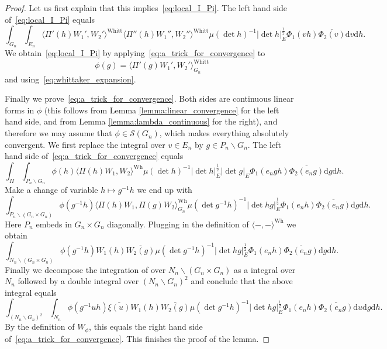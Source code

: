 \documentclass[letterpaper,11pt]{amsart}
\newcommand{\cS}{\mathcal{S}}
\newcommand{\rd}{\mathrm{d}}
\newcommand{\bs}{\backslash}
\newcommand{\<}{\negthickspace}
\providecommand{\abs}[1]{\lvert#1\rvert}
\theoremstyle{definition}
\theoremstyle{plain}
\theoremstyle{remark}
\numberwithin{equation}{section}
\begin{document}
\begin{proof}
Let us first explain that this implies~\eqref{eq:local_I_Pi}. The left hand
side of~\eqref{eq:local_I_Pi} equals
    \[
    \int_{G_n} \int_{E_n}
    \langle \Pi'(h)W_1', W_2' \rangle^{\mathrm{Whitt}}
    \langle \Pi''(h)W_1'', W_2'' \rangle^{\mathrm{Whitt}}
    \mu(\det h)^{-1} \abs{\det h}_E^{\frac{1}{2}}
    \Phi_1(vh) \overline{\Phi_2(v)} \rd v \rd h.
    \]
We obtain~\eqref{eq:local_I_Pi} by
applying~\eqref{eq:a_trick_for_convergence} to
    \[
    \phi(g) = \langle \Pi'(g)W_1', W_2' \rangle_{G_n}^{\mathrm{Whitt}}
    \]
and using~\eqref{eq:whittaker_expansion}.

Finally we prove~\eqref{eq:a_trick_for_convergence}. Both sides are
continuous linear forms in $\phi$ (this follows from Lemma
\ref{lemma:linear_convergence} for the left hand side, and from Lemma
\ref{lemma:lambda_continuous} for the right), and therefore we may assume
that $\phi \in \cS(G_n)$, which makes everything absolutely convergent. We
first replace the integral over $v \in E_n$ by $g \in P_n \bs G_n$. The
left hand side of~\eqref{eq:a_trick_for_convergence} equals
    \[
    \int_{H} \int_{P_n \bs G_n}
    \phi(h)
    \langle \Pi(h)W_1, W_2 \rangle^{\mathrm{Wh}}
    \mu(\det h)^{-1} \abs{\det h}_E^{\frac{1}{2}} \abs{\det g}_E
    \Phi_1(e_ngh) \overline{\Phi_2(e_ng)} \rd g \rd h.
    \]
Make a change of variable $h \mapsto g^{-1}h$ we end up with
    \[
    \int_{P_n \bs (G_n \times G_n)}
    \phi(g^{-1} h)
    \langle \Pi(h)W_1, \Pi(g) W_2 \rangle_{G_n}^{\mathrm{Wh}}
    \mu(\det g^{-1} h)^{-1} \abs{\det hg}_E^{\frac{1}{2}}
    \Phi_1(e_nh) \overline{\Phi_2(e_ng)} \rd g \rd h.
    \]
Here $P_n$ embeds in $G_n \times G_n$ diagonally. Plugging in the definition
of $\langle-,-\rangle^{\mathrm{Wh}}$ we obtain
    \[
    \int_{N_n \bs (G_n \times G_n)}
    \phi(g^{-1} h)
    W_1(h)\overline{W_2(g)}
    \mu(\det g^{-1} h)^{-1} \abs{\det hg}_E^{\frac{1}{2}}
    \Phi_1(e_nh) \overline{\Phi_2(e_ng)} \rd g \rd h.
    \]
Finally we decompose the integration of over $N_n \bs (G_n \times
G_n)$ as a integral over $N_n$ followed by a double integral over
$(N_n \bs G_n)^2$ and conclude that the above integral equals
    \[
    \int_{(N_n \bs G_n)^2} \int_{N_n}
    \phi(g^{-1} u h) \overline{\xi(u)}
    W_1(h)\overline{W_2(g)}
    \mu(\det g^{-1} h)^{-1} \abs{\det hg}_E^{\frac{1}{2}}
    \Phi_1(e_nh) \overline{\Phi_2(e_ng)} \rd u \rd g \rd h.
    \]
By the definition of $W_{\phi}$, this equals the right hand side
of~\eqref{eq:a_trick_for_convergence}. This finishes the proof of the lemma.
\end{proof}
\end{document}
